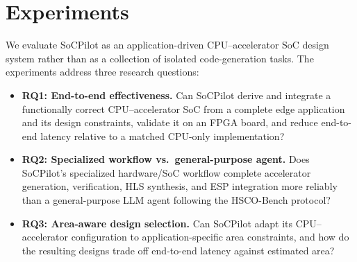 \section{Experiments}
\label{sec:evaluation}

We evaluate SoCPilot as an application-driven CPU--accelerator SoC design system rather than as a collection of isolated code-generation tasks. The experiments address three research questions:
\begin{itemize}
\item \textbf{RQ1: End-to-end effectiveness.}
Can SoCPilot derive and integrate a functionally correct CPU--accelerator SoC from a complete edge application and its design constraints, validate it on an FPGA board, and reduce end-to-end latency relative to a matched CPU-only implementation?

\item \textbf{RQ2: Specialized workflow vs.\ general-purpose agent.}
Does SoCPilot’s specialized hardware/SoC workflow complete accelerator generation, verification, HLS synthesis, and ESP integration more reliably than a general-purpose LLM agent following the HSCO-Bench\cite{hscobench2026} protocol? 

\item \textbf{RQ3: Area-aware design selection.}
Can SoCPilot adapt its CPU--accelerator configuration to application-specific area constraints, and how do the resulting designs trade off end-to-end latency against estimated area?
\end{itemize}


